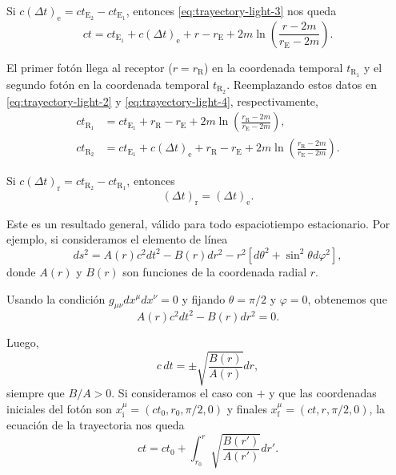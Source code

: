 \documentclass[letterpaper,11pt]{article}
\begin{document}
Si $c(\Delta t)_{\text{e}} = ct_{\text{E}_2} - ct_{\text{E}_1}$, entonces \eqref{eq:trayectory-light-3} nos queda
\begin{equation}
ct = ct_{\text{E}_1} + c(\Delta t)_{\text{e}} + r - r_{\text{E}} + 2m \ln\left( \frac{r-2m}{r_{\text{E}} - 2m}\right). \label{eq:trayectory-light-4}
\end{equation}

El primer fotón llega al receptor ($r = r_{\text{R}}$) en la coordenada temporal $t_{\text{R}_1}$  y el segundo fotón en la coordenada temporal $t_{\text{R}_2}$. Reemplazando estos datos en \eqref{eq:trayectory-light-2} y \eqref{eq:trayectory-light-4}, respectivamente,
\begin{align}
ct_{\text{R}_1} &=  ct_{\text{E}_1} + r_{\text{R}} - r_{\text{E}} + 2m \ln\left( \frac{r_{\text{R}}-2m}{r_{\text{E}} - 2m}\right), \label{eq:trayectory-light-5} \\
ct_{\text{R}_2} &=  ct_{\text{E}_1} + c(\Delta t)_{\text{e}} + r_{\text{R}} - r_{\text{E}} + 2m \ln\left( \frac{r_{\text{R}}-2m}{r_{\text{E}} - 2m}\right). \label{eq:trayectory-light-6}
\end{align}

Si $c(\Delta t)_{\text{r}} = ct_{\text{R}_2} - ct_{\text{R}_1}$, entonces
\begin{equation}
(\Delta t)_{\text{r}} = (\Delta t)_{\text{e}}.
\end{equation}

Este es un resultado general, válido para todo espaciotiempo estacionario. Por ejemplo, si consideramos el elemento de línea
\begin{equation}
ds^2 = A(r) c^2 dt^2 - B(r) dr^2 - r^2 [d\theta^2 + \sin^2\theta d\varphi^2],
\end{equation}
donde $A(r)$ y $B(r)$ son funciones de la coordenada radial $r$.

Usando la condición $g_{\mu\nu} dx^{\mu}dx^{\nu} = 0$ y fijando $\theta = \pi/2$ y $\varphi = 0$, obtenemos que
\begin{equation}
A(r) c^2dt^2 - B(r) dr^2 = 0.
\end{equation} 

Luego,
\begin{equation}
c\,dt = \pm \sqrt{\frac{B(r)}{A(r)}} dr,
\end{equation}
siempre que $B/A > 0$. Si consideramos el caso con $+$ y que las coordenadas iniciales del fotón son $x_{\text{i}}^{\mu} = (ct_0,r_0,\pi/2,0)$ y finales $x_{\text{f}}^{\mu} = (ct,r,\pi/2,0)$, la ecuación de la trayectoria nos queda
\begin{equation}
ct = ct_0 + \int_{r_0}^{r} \sqrt{\frac{B(r')}{A(r')}} dr'.
\end{equation}
\end{document}

